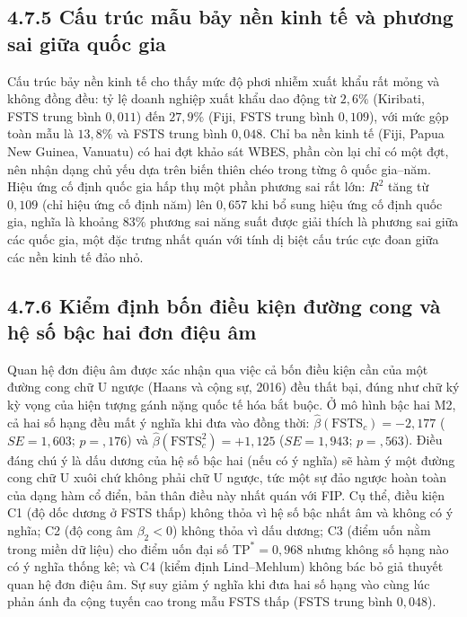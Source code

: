 \documentclass[
  a4paper,
  13pt]{extreport}
\begin{document}
\hypertarget{cux1ea5u-truxfac-mux1eabu-bux1ea3y-nux1ec1n-kinh-tux1ebf-vuxe0-phux1b0ux1a1ng-sai-giux1eefa-quux1ed1c-gia}{%
\subsection{4.7.5 Cấu trúc mẫu bảy nền kinh tế và phương sai giữa quốc
gia}\label{cux1ea5u-truxfac-mux1eabu-bux1ea3y-nux1ec1n-kinh-tux1ebf-vuxe0-phux1b0ux1a1ng-sai-giux1eefa-quux1ed1c-gia}}

Cấu trúc bảy nền kinh tế cho thấy mức độ phơi nhiễm xuất khẩu rất mỏng
và không đồng đều: tỷ lệ doanh nghiệp xuất khẩu dao động từ \(2{,}6\%\)
(Kiribati, FSTS trung bình \(0{,}011\)) đến \(27{,}9\%\) (Fiji, FSTS
trung bình \(0{,}109\)), với mức gộp toàn mẫu là \(13{,}8\%\) và FSTS
trung bình \(0{,}048\). Chỉ ba nền kinh tế (Fiji, Papua New Guinea,
Vanuatu) có hai đợt khảo sát WBES, phần còn lại chỉ có một đợt, nên nhận
dạng chủ yếu dựa trên biến thiên chéo trong từng ô quốc gia--năm. Hiệu
ứng cố định quốc gia hấp thụ một phần phương sai rất lớn: \(R^2\) tăng
từ \(0{,}109\) (chỉ hiệu ứng cố định năm) lên \(0{,}657\) khi bổ sung
hiệu ứng cố định quốc gia, nghĩa là khoảng \(83\%\) phương sai năng suất
được giải thích là phương sai giữa các quốc gia, một đặc trưng nhất quán
với tính dị biệt cấu trúc cực đoan giữa các nền kinh tế đảo nhỏ.

\hypertarget{kiux1ec3m-ux111ux1ecbnh-bux1ed1n-ux111iux1ec1u-kiux1ec7n-ux111ux1b0ux1eddng-cong-vuxe0-hux1ec7-sux1ed1-bux1eadc-hai-ux111ux1a1n-ux111iux1ec7u-uxe2m}{%
\subsection{4.7.6 Kiểm định bốn điều kiện đường cong và hệ số bậc hai
đơn điệu
âm}\label{kiux1ec3m-ux111ux1ecbnh-bux1ed1n-ux111iux1ec1u-kiux1ec7n-ux111ux1b0ux1eddng-cong-vuxe0-hux1ec7-sux1ed1-bux1eadc-hai-ux111ux1a1n-ux111iux1ec7u-uxe2m}}

Quan hệ đơn điệu âm được xác nhận qua việc cả bốn điều kiện cần của một
đường cong chữ U ngược (Haans và cộng sự, 2016) đều thất bại, đúng như
chữ ký kỳ vọng của hiện tượng gánh nặng quốc tế hóa bắt buộc. Ở mô hình
bậc hai M2, cả hai số hạng đều mất ý nghĩa khi đưa vào đồng thời:
\(\hat{\beta}(\text{FSTS}_c) = -2{,}177\) (\(SE = 1{,}603\);
\(p = {,}176\)) và \(\hat{\beta}(\text{FSTS}_c^2) = +1{,}125\)
(\(SE = 1{,}943\); \(p = {,}563\)). Điều đáng chú ý là dấu dương của hệ
số bậc hai (nếu có ý nghĩa) sẽ hàm ý một đường cong chữ U xuôi chứ không
phải chữ U ngược, tức một sự đảo ngược hoàn toàn của dạng hàm cổ điển,
bản thân điều này nhất quán với FIP. Cụ thể, điều kiện C1 (độ dốc dương
ở FSTS thấp) không thỏa vì hệ số bậc nhất âm và không có ý nghĩa; C2 (độ
cong âm \(\beta_2 < 0\)) không thỏa vì dấu dương; C3 (điểm uốn nằm trong
miền dữ liệu) cho điểm uốn đại số \(\text{TP}^* = 0{,}968\) nhưng không
số hạng nào có ý nghĩa thống kê; và C4 (kiểm định Lind--Mehlum) không
bác bỏ giả thuyết quan hệ đơn điệu âm. Sự suy giảm ý nghĩa khi đưa hai
số hạng vào cùng lúc phản ánh đa cộng tuyến cao trong mẫu FSTS thấp
(FSTS trung bình \(0{,}048\)).
\end{document}
